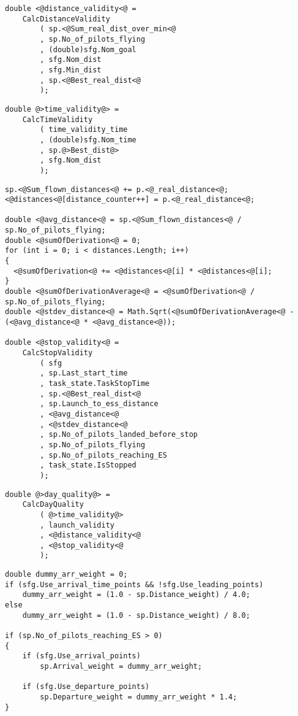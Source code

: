 \documentclass[gap.tex]{subfiles}
\begin{document}
\begin{lstlisting}[style=base, caption={Distance validity depends on \textcolor{blue}{real} distance inputs.}]
double <@distance_validity<@ =
    CalcDistanceValidity
        ( sp.<@Sum_real_dist_over_min<@
        , sp.No_of_pilots_flying
        , (double)sfg.Nom_goal
        , sfg.Nom_dist
        , sfg.Min_dist
        , sp.<@Best_real_dist<@
        );
\end{lstlisting}

\begin{lstlisting}[style=base, caption={Time validity depends on \textcolor{red}{bonus} distance input.}]
double @>time_validity@> =
    CalcTimeValidity
        ( time_validity_time
        , (double)sfg.Nom_time
        , sp.@>Best_dist@>
        , sfg.Nom_dist
        );
\end{lstlisting}

\begin{lstlisting}[style=base, caption={Stop validity depends on \textcolor{blue}{real} distance inputs.}]
sp.<@Sum_flown_distances<@ += p.<@_real_distance<@;
<@distances<@[distance_counter++] = p.<@_real_distance<@;

double <@avg_distance<@ = sp.<@Sum_flown_distances<@ / sp.No_of_pilots_flying;
double <@sumOfDerivation<@ = 0;
for (int i = 0; i < distances.Length; i++)
{
  <@sumOfDerivation<@ += <@distances<@[i] * <@distances<@[i];
}
double <@sumOfDerivationAverage<@ = <@sumOfDerivation<@ / sp.No_of_pilots_flying;
double <@stdev_distance<@ = Math.Sqrt(<@sumOfDerivationAverage<@ - (<@avg_distance<@ * <@avg_distance<@));

double <@stop_validity<@ =
    CalcStopValidity
        ( sfg
        , sp.Last_start_time
        , task_state.TaskStopTime
        , sp.<@Best_real_dist<@
        , sp.Launch_to_ess_distance
        , <@avg_distance<@
        , <@stdev_distance<@
        , sp.No_of_pilots_landed_before_stop
        , sp.No_of_pilots_flying
        , sp.No_of_pilots_reaching_ES
        , task_state.IsStopped
        );
\end{lstlisting}

\begin{lstlisting}[style=base, caption={Task validity depends on \textcolor{red}{bonus} distance.}]
double @>day_quality@> =
    CalcDayQuality
        ( @>time_validity@>
        , launch_validity
        , <@distance_validity<@
        , <@stop_validity<@
        );
\end{lstlisting}

\begin{lstlisting}[style=base, caption={Arrival weight and departure weight don't depend on distance inputs.}]
double dummy_arr_weight = 0;
if (sfg.Use_arrival_time_points && !sfg.Use_leading_points)
    dummy_arr_weight = (1.0 - sp.Distance_weight) / 4.0;
else
    dummy_arr_weight = (1.0 - sp.Distance_weight) / 8.0;

if (sp.No_of_pilots_reaching_ES > 0)
{
    if (sfg.Use_arrival_points)
        sp.Arrival_weight = dummy_arr_weight;

    if (sfg.Use_departure_points)
        sp.Departure_weight = dummy_arr_weight * 1.4;
}
\end{lstlisting}
\end{document}
